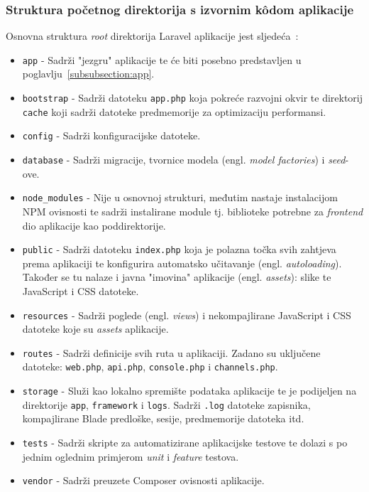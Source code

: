 \subsubsection{Struktura početnog direktorija s izvornim k\^odom aplikacije}
Osnovna struktura \textit{root} direktorija Laravel aplikacije jest sljedeća~\cite{structure}:  \\

\begin{itemize}
\item \texttt{app} - Sadrži "jezgru" aplikacije te će biti posebno predstavljen u poglavlju~\ref{subsubsection:app}.
\item \texttt{bootstrap} - Sadrži datoteku \texttt{app.php} koja pokreće razvojni okvir te direktorij \texttt{cache} koji sadrži datoteke predmemorije za optimizaciju performansi.
\item \texttt{config} - Sadrži konfiguracijske datoteke.
\item \texttt{database} - Sadrži migracije, tvornice modela (engl. \textit{model factories}) i \textit{seed}-ove.
\item \texttt{node\_modules} - Nije u osnovnoj strukturi, međutim nastaje instalacijom NPM ovisnosti te sadrži instalirane module tj. biblioteke potrebne za \textit{frontend} dio aplikacije kao poddirektorije.
\item \texttt{public} - Sadrži datoteku \texttt{index.php} koja je polazna točka svih zahtjeva prema aplikaciji te konfigurira automatsko učitavanje (engl. \textit{autoloading}).  Također se tu nalaze i javna "imovina" aplikacije (engl. \textit{assets}): slike te JavaScript i CSS datoteke.
\item \texttt{resources} - Sadrži poglede (engl. \textit{views}) i nekompajlirane JavaScript i CSS datoteke koje su \textit{assets} aplikacije.
\item \texttt{routes} - Sadrži definicije svih ruta u aplikaciji. Zadano su uključene datoteke: \texttt{web.php}, \texttt{api.php}, \texttt{console.php} i \texttt{channels.php}.
\item \texttt{storage} - Služi kao lokalno spremište podataka aplikacije te je podijeljen na direktorije \texttt{app}, \texttt{framework} i \texttt{logs}. Sadrži \texttt{.log} datoteke zapisnika, kompajlirane Blade predloške, sesije, predmemorije datoteka itd.
\item \texttt{tests} - Sadrži skripte za automatizirane aplikacijske testove te dolazi s po jednim oglednim primjerom \textit{unit} i \textit{feature} testova.
\item \texttt{vendor} - Sadrži preuzete Composer ovisnosti aplikacije.
\end{itemize}

